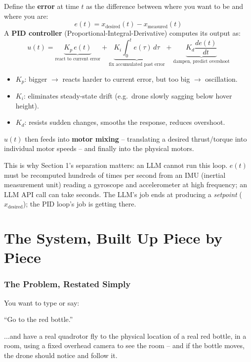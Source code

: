 \documentclass[11pt,a4paper]{article}
\begin{document}
\begin{mathbox}
Define the \textbf{error} at time $t$ as the difference between where you want to be and where
you are:
\[
e(t) = x_{\text{desired}}(t) - x_{\text{measured}}(t)
\]
A \textbf{PID controller} (Proportional-Integral-Derivative) computes its output as:
\[
u(t) = \underbrace{K_p\, e(t)}_{\text{react to current error}}
+ \underbrace{K_i \int_0^t e(\tau)\,d\tau}_{\text{fix accumulated past error}}
+ \underbrace{K_d \frac{de(t)}{dt}}_{\text{dampen, predict overshoot}}
\]
\begin{itemize}[itemsep=1pt]
\item $K_p$: bigger $\to$ reacts harder to current error, but too big $\to$ oscillation.
\item $K_i$: eliminates steady-state drift (e.g.\ drone slowly sagging below hover height).
\item $K_d$: resists sudden changes, smooths the response, reduces overshoot.
\end{itemize}
$u(t)$ then feeds into \textbf{motor mixing} -- translating a desired thrust/torque into
individual motor speeds -- and finally into the physical motors.
\end{mathbox}

This is why Section 1's separation matters: an LLM cannot run this loop. $e(t)$ must be
recomputed hundreds of times per second from an IMU (inertial measurement unit) reading a
gyroscope and accelerometer at high frequency; an LLM API call can take seconds. The LLM's job
ends at producing a \emph{setpoint} ($x_{\text{desired}}$); the PID loop's job is getting there.

\part{The System, Built Up Piece by Piece}

\section{The Problem, Restated Simply}

You want to type or say:

\begin{quotebox}
\centering \Large ``Go to the red bottle.''
\end{quotebox}

...and have a real quadrotor fly to the physical location of a real red bottle, in a room, using
a fixed overhead camera to see the room -- and if the bottle moves, the drone should notice and
follow it.
\end{document}
